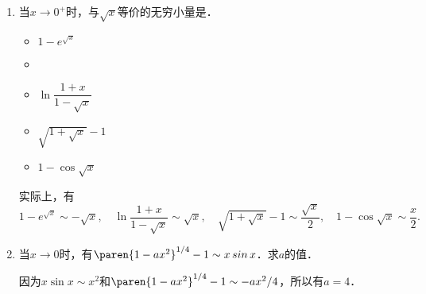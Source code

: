 \begin{enumerate}
\item 当\(x \to 0^+\)时，与\(\sqrt x\)等价的无穷小量是\uline{\makebox[6em]{}}．
  \begin{itemize}
    \renewcommand{\labelitemi}{\faCircleThin}
  \item \(1 - e^{\sqrt x}\)
    \ifshowsol
    \item[\faCircle]
    \else
    \item
    \fi
    \(\ln \dfrac{1+x}{1-\sqrt x}\)\rule[-2ex]{0ex}{5ex}
  \item \(\sqrt{1 + \sqrt x} - 1\)
  \item \(1 - \cos\sqrt x\)
  \end{itemize}

  \ifshowsol
    实际上，有
    \begin{equation*}
      1 - e^{\sqrt x} \sim -\sqrt x, \quad
      \ln \dfrac{1+x}{1-\sqrt x} \sim \sqrt x, \quad
      \sqrt{1 + \sqrt x} - 1 \sim \frac{\sqrt x}{2}, \quad
      1 - \cos\sqrt x \sim \frac x2.
    \end{equation*}
  \fi

\item 当\(x \to 0\)时，有\(\paren{1-ax^2}^{1/4} - 1 \sim x \sin x\)．求\(a\)的值．

  \ifshowsol
    因为\(x \sin x \sim x^2\)和\(\paren{1-ax^2}^{1/4} - 1 \sim -ax^2/4\)，所以有\(a = 4\)．
  \fi
\end{enumerate}
\fi

